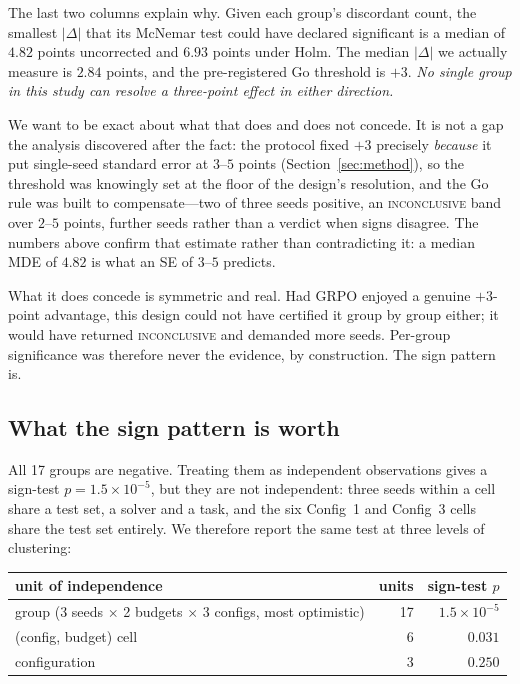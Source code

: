 The last two columns explain why. Given each group's discordant count, the
smallest $|\Delta|$ that its McNemar test could have declared significant is a
median of $4.82$ points uncorrected and $6.93$ points under Holm. The median
$|\Delta|$ we actually measure is $2.84$ points, and the pre-registered Go
threshold is $+3$. \emph{No single group in this study can resolve a three-point
effect in either direction.}

We want to be exact about what that does and does not concede. It is not a gap
the analysis discovered after the fact: the protocol fixed $+3$ precisely
\emph{because} it put single-seed standard error at $3$--$5$ points
(Section~\ref{sec:method}), so the threshold was knowingly set at the floor of
the design's resolution, and the Go rule was built to compensate---two of three
seeds positive, an \textsc{inconclusive} band over $2$--$5$ points, further
seeds rather than a verdict when signs disagree. The numbers above confirm that
estimate rather than contradicting it: a median MDE of $4.82$ is what an SE of
$3$--$5$ predicts.

What it does concede is symmetric and real. Had GRPO enjoyed a genuine
$+3$-point advantage, this design could not have certified it group by group
either; it would have returned \textsc{inconclusive} and demanded more seeds.
Per-group significance was therefore never the evidence, by construction. The
sign pattern is.

\subsection{What the sign pattern is worth}

All 17 groups are negative. Treating them as independent observations gives a
sign-test $p = 1.5{\times}10^{-5}$, but they are not independent: three seeds
within a cell share a test set, a solver and a task, and the six Config~1 and
Config~3 cells share the test set entirely. We therefore report the same test at
three levels of clustering:

\begin{center}
\begin{tabular}{lrr}
\toprule
unit of independence & units & sign-test $p$ \\
\midrule
group (3 seeds $\times$ 2 budgets $\times$ 3 configs, most optimistic) & 17 & $1.5{\times}10^{-5}$ \\
(config, budget) cell & 6 & $0.031$ \\
configuration & 3 & $0.250$ \\
\bottomrule
\end{tabular}
\end{center}

